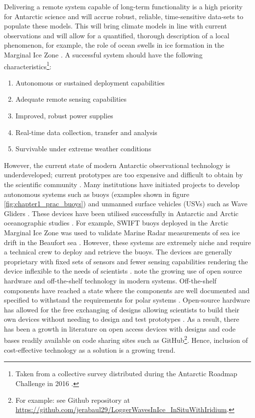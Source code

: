Delivering a remote system capable of long-term functionality is a high priority for Antarctic science \cite{kennicutt2016delivering} and will accrue robust, reliable, time-sensitive data-sets to populate these models. This will bring climate models in line with current observations and will allow for a quantified, thorough description of a local phenomenon, for example, the role of ocean swells in ice formation in the Marginal Ice Zone \cite{doble2013wave,doble2017robust}. A successful system should have the following characteristics\footnote{Taken from a collective survey distributed during the Antarctic Roadmap Challenge in 2016 \cite{kennicutt2016delivering}.}: 
\begin{enumerate}

    \item Autonomous or sustained deployment capabilities
    \item Adequate remote sensing capabilities
    \item Improved, robust power supplies
    \item Real-time data collection, transfer and analysis
    \item Survivable under extreme weather conditions
\end{enumerate}

However, the current state of  modern Antarctic observational technology is underdeveloped; current prototypes are too expensive and difficult to obtain by the scientific community \cite{kennicutt2016delivering}. Many institutions have initiated projects to develop autonomous systems such as buoys (examples shown in figure \ref{fig:chapter1_prac_buoys}) and unmanned surface vehicles (USVs) such as Wave Gliders \cite{liquidrobot2016wave}. These devices have been utilised successfully in Antarctic and Arctic oceanographic studies \cite{swart2020submesoscale}. For example, SWIFT buoys deployed in the Arctic Marginal Ice Zone was used to validate Marine Radar measurements of sea ice drift in the Beaufort sea \cite{lund2018Arctic}. However, these systems are extremely niche and require a technical crew to deploy and retrieve the buoys. The devices are generally proprietary with fixed sets of sensors and fewer sensing capabilities rendering the device inflexible to the needs of scientists \cite{rabault2017measurements}. \textcite{rabault2019open} note the growing use of open source hardware and off-the-shelf technology in modern systems. Off-the-shelf  components have reached a state where the components are well documented and specified to withstand the requirements for polar systems \cite{rabault2019open}. Open-source hardware has allowed for the free exchanging of designs allowing scientists to build their own devices without needing to design and test prototypes \cite{rabault2019open}. As a result, there has been a growth in literature on open access devices with designs and code bases readily available on code sharing sites such as GitHub\footnote{For example: see \textcite{rabault2019open} Github repository at \url{https://github.com/jerabaul29/LoggerWavesInIce_InSituWithIridium}.}. Hence, inclusion of cost-effective technology as a solution is a growing trend. \par 


